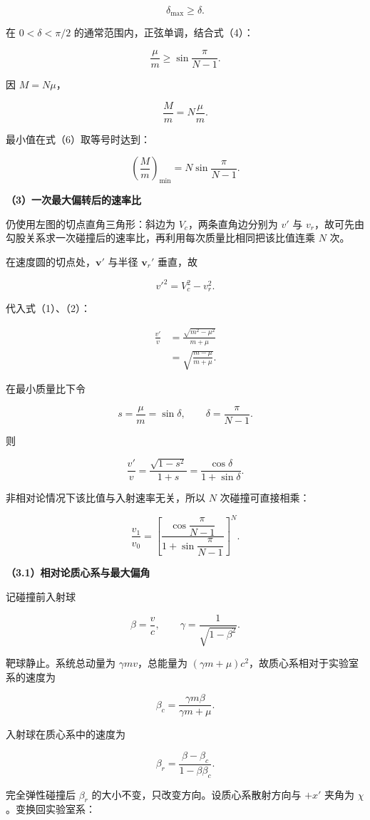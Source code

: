 \documentclass[12pt,a4paper,UTF8]{ctexart}
\begin{document}
\[\delta_{\max}\geq\delta.\]

在 \(0<\delta<\pi/2\) 的通常范围内，正弦单调，结合式（4）：

\[\frac\mu m\geq\sin\frac{\pi}{N-1}.\]

因 \(M=N\mu\)，

\[\frac Mm=N\frac\mu m.\]

最小值在式（6）取等号时达到：

\[\boxed{
\left(\frac Mm\right)_{\min}
=N\sin\frac{\pi}{N-1}}.\]

\textbf{（3）一次最大偏转后的速率比}

仍使用左图的切点直角三角形：斜边为 \(V_c\)，两条直角边分别为 \(v'\) 与
\(v_r\)，故可先由勾股关系求一次碰撞后的速率比，再利用每次质量比相同把该比值连乘
\(N\) 次。

在速度圆的切点处，\(\bm v'\) 与半径 \(\bm v_r'\) 垂直，故

\[v'^2=V_c^2-v_r^2.\]

代入式（1）、（2）：

\[\begin{aligned}
\frac{v'}v
&=\frac{\sqrt{m^2-\mu^2}}{m+\mu}\\
&=\sqrt{\frac{m-\mu}{m+\mu}}.
\end{aligned}\]

在最小质量比下令

\[s=\frac\mu m=\sin\delta,
\qquad \delta=\frac{\pi}{N-1}.\]

则

\[\frac{v'}v=\frac{\sqrt{1-s^2}}{1+s}
=\frac{\cos\delta}{1+\sin\delta}.\]

非相对论情况下该比值与入射速率无关，所以 \(N\) 次碰撞可直接相乘：

\[\boxed{
\frac{v_1}{v_0}
=\left[
\frac{\cos\dfrac{\pi}{N-1}}
{1+\sin\dfrac{\pi}{N-1}}
\right]^N}.\]

\textbf{（3.1）相对论质心系与最大偏角}

记碰撞前入射球

\[\beta=\frac vc,\qquad \gamma=\frac1{\sqrt{1-\beta^2}}.\]

靶球静止。系统总动量为 \(\gamma mv\)，总能量为
\((\gamma m+\mu)c^2\)，故质心系相对于实验室系的速度为

\[\boxed{\beta_c=\frac{\gamma m\beta}{\gamma m+\mu}}.\]

入射球在质心系中的速度为

\[\beta_r=\frac{\beta-\beta_c}{1-\beta\beta_c}.\]

完全弹性碰撞后 \(\beta_r\) 的大小不变，只改变方向。设质心系散射方向与
\(+x'\) 夹角为 \(\chi\)。变换回实验室系：
\end{document}
